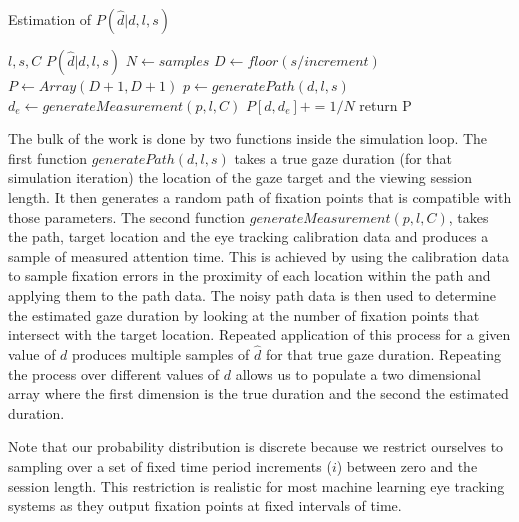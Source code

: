 \documentclass[12pt,a4paper]{article}
\numberwithin{equation}{section}
\begin{document}
\begin{algorithm}
\caption{Estimation of $P(\hat{d}|d,l,s)$}\label{alg:p_of_dhat}
\begin{algorithmic}
  \Require $l,s,C$
  \Ensure $P(\hat{d}|d,l,s)$
  \State $N \gets samples$              
  \State $D \gets floor(s / increment)$ 
  \State $P \gets Array(D+1,D+1)$       
                    
                    
      \State $p \gets generatePath(d,l,s)$
      \State $d_e \gets generateMeasurement(p,l,C)$  
      \State $P[d,d_e] += 1/N$          
    \EndFor
  \EndFor
  \State return P
\end{algorithmic}
\end{algorithm}


The bulk of the work is done by two functions inside the simulation loop. The first function
$generatePath(d,l,s)$ takes a true gaze duration (for that simulation iteration) the location
of the gaze target and the viewing session length. It then
generates a random path of fixation points that is compatible with those parameters.
The second function 
$generateMeasurement(p,l,C)$, takes the path, target location and the eye tracking calibration 
data and produces a sample of measured attention time.
This is achieved by using the calibration data to sample
fixation errors in the proximity of each location within the path and applying them to the path data. 
The noisy path data is then used to determine
the estimated gaze duration by looking at the number of fixation points that intersect with the target
location.
Repeated application of this process for a given value of $d$ produces multiple samples of $\hat{d}$
for that true gaze duration. Repeating the process over different 
values of $d$ allows us to populate a two dimensional array where the first dimension is the
true duration and the second the estimated duration. 

Note that our probability distribution is discrete
because we restrict ourselves to sampling over a set of fixed time period increments ($i$) 
between zero and the session length. This restriction is realistic for most machine learning
eye tracking systems as they output fixation points at fixed intervals of time.
\end{document}
